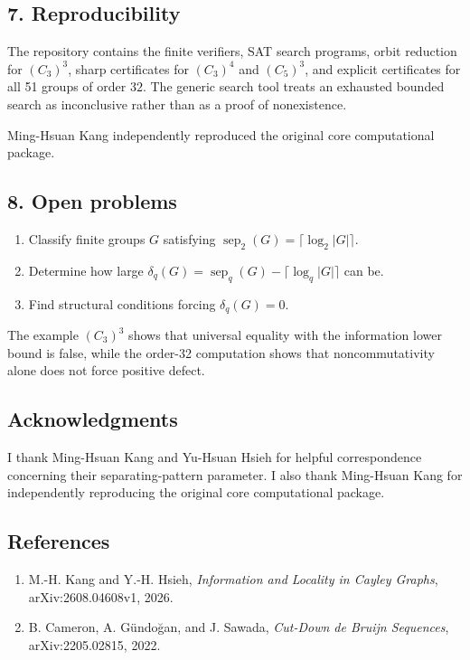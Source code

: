 \documentclass[
]{article}
\begin{document}
\subsection{7. Reproducibility}
The repository contains the finite verifiers, SAT search programs, orbit reduction for \((C_3)^3\), sharp certificates for \((C_3)^4\) and \((C_5)^3\), and explicit certificates for all 51 groups of order \(32\). The generic search tool treats an exhausted bounded search as inconclusive rather than as a proof of nonexistence.

Ming-Hsuan Kang independently reproduced the original core computational package.

\subsection{8. Open problems}
\begin{enumerate}
\item Classify finite groups \(G\) satisfying \(\operatorname{sep}_2(G)=\lceil\log_2|G|\rceil\).
\item Determine how large \(\delta_q(G)=\operatorname{sep}_q(G)-\lceil\log_q|G|\rceil\) can be.
\item Find structural conditions forcing \(\delta_q(G)=0\).
\end{enumerate}
The example \((C_3)^3\) shows that universal equality with the information lower bound is false, while the order-32 computation shows that noncommutativity alone does not force positive defect.

\subsection{Acknowledgments}
I thank Ming-Hsuan Kang and Yu-Hsuan Hsieh for helpful correspondence concerning their separating-pattern parameter. I also thank Ming-Hsuan Kang for independently reproducing the original core computational package.

\subsection{References}
\begin{enumerate}
\item M.-H. Kang and Y.-H. Hsieh, \emph{Information and Locality in Cayley Graphs}, arXiv:2608.04608v1, 2026.
\item B. Cameron, A. Gündoğan, and J. Sawada, \emph{Cut-Down de Bruijn Sequences}, arXiv:2205.02815, 2022.
\end{enumerate}
\end{document}
